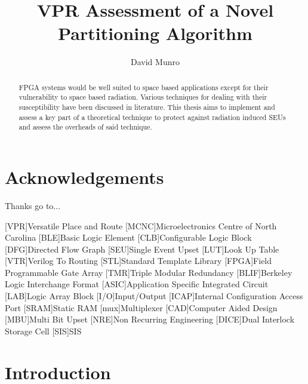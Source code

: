 \documentclass[12pt,final,oneside]{memoir} %
\title{VPR Assessment of a Novel Partitioning Algorithm}
\author{David Munro}
\begin{document}
\maketitle
\begin{abstract}
	\ac{FPGA} systems would be well suited to space based applications except for their vulnerability to space based radiation. Various techniques for dealing with their susceptibility have been discussed in literature. This thesis aims to implement and assess a key part of a theoretical technique to protect against radiation induced \acp{SEU} and assess the overheads of said technique.
\acresetall
\end{abstract}
\chapter*{Acknowledgements}
Thanks go to...

\tableofcontents*
\newpage

\begin{acronym}
[VPR]{Versatile Place and Route}
[MCNC]{Microelectronics Centre of North Carolina}
[BLE]{Basic Logic Element}
[CLB]{Configurable Logic Block}
[DFG]{Directed Flow Graph}
[SEU]{Single Event Upset}
[LUT]{Look Up Table}
[VTR]{Verilog To Routing}
[STL]{Standard Template Library}
[FPGA]{Field Programmable Gate Array}
[TMR]{Triple Modular Redundancy}
[BLIF]{Berkeley Logic Interchange Format}
[ASIC]{Application Specific Integrated Circuit}
[LAB]{Logic Array Block}
[I/O]{Input/Output}
[ICAP]{Internal Configuration Access Port}
[SRAM]{Static RAM}
[mux]{Multiplexer}
[CAD]{Computer Aided Design}
[MBU]{Multi Bit Upset}
[NRE]{Non Recurring Engineering}
[DICE]{Dual Interlock Storage Cell}
[SIS]{SIS}
\end{acronym}
\chapter{Introduction}
\end{document}
